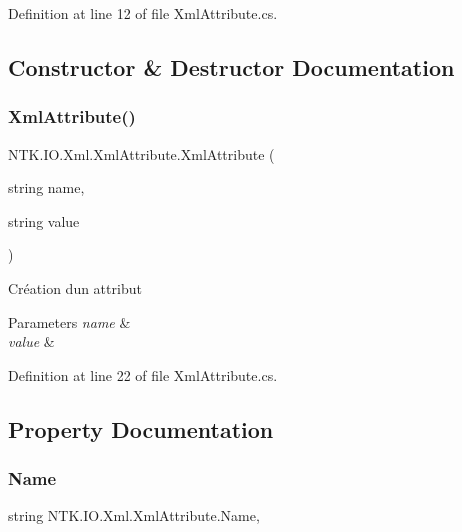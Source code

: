 Definition at line 12 of file Xml\+Attribute.\+cs.



\subsection{Constructor \& Destructor Documentation}
\mbox{\label{class_n_t_k_1_1_i_o_1_1_xml_1_1_xml_attribute_afe2227ace97b20f0c14f13c1b61f0131}} 
\subsubsection{\texorpdfstring{XmlAttribute()}{XmlAttribute()}}
{\footnotesize\ttfamily N\+T\+K.\+I\+O.\+Xml.\+Xml\+Attribute.\+Xml\+Attribute (\begin{DoxyParamCaption}\item[{string}]{name,  }\item[{string}]{value }\end{DoxyParamCaption})}



Création d\textquotesingle{}un attribut 


\begin{DoxyParams}{Parameters}
{\em name} & \\
\hline
{\em value} & \\
\hline
\end{DoxyParams}


Definition at line 22 of file Xml\+Attribute.\+cs.



\subsection{Property Documentation}
\mbox{\label{class_n_t_k_1_1_i_o_1_1_xml_1_1_xml_attribute_a72191c90f363e01a2f6c4360fc5f7ab5}} 
\subsubsection{\texorpdfstring{Name}{Name}}
{\footnotesize\ttfamily string N\+T\+K.\+I\+O.\+Xml.\+Xml\+Attribute.\+Name\hspace{0.3cm}{\ttfamily [get]}, {\ttfamily [set]}}



